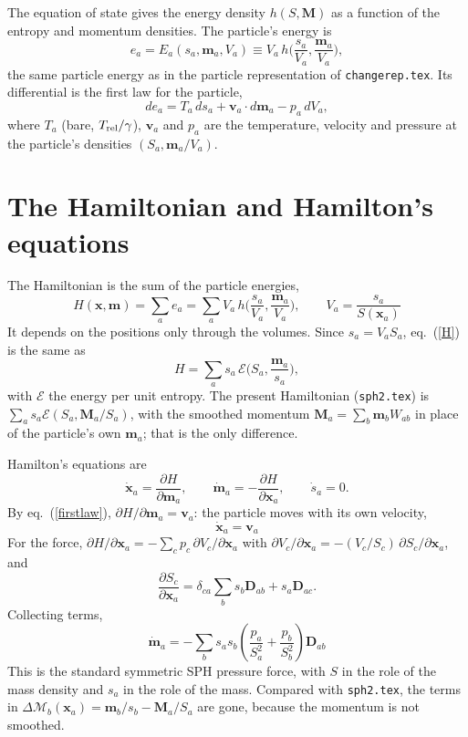 \documentclass[11pt,aps,preprint,nofootinbib,superscriptaddress,tightenlines]{revtex4-2}
\def\st{\begin{equation}}
\def\stp{\end{equation}}
\def\Eq#1{eq.~(\ref{#1})}
\begin{document}
The equation of state gives the energy density $h(S,\bm M)$ as a function of the
entropy and momentum densities.  The particle's energy is
\st
e_a=E_a(s_a,\bm m_a,V_a)\equiv V_a\,h\Big(\frac{s_a}{V_a},\frac{\bm m_a}{V_a}\Big),
\label{ea}
\stp
the same particle energy as in the particle representation of
\texttt{changerep.tex}.  Its differential is the first law for the particle,
\st
de_a=T_a\,ds_a+\bm v_a\cdot d\bm m_a-p_a\,dV_a ,
\label{firstlaw}
\stp
where $T_a$ (bare, $T_{\rm rel}/\gamma$), $\bm v_a$ and $p_a$ are the temperature,
velocity and pressure at the particle's densities $(S_a,\bm m_a/V_a)$.

\section{The Hamiltonian and Hamilton's equations}
\label{sec:ham}

The Hamiltonian is the sum of the particle energies,
\st
\boxed{\;H(\bm x,\bm m)=\sum_ae_a=\sum_aV_a\,h\Big(\frac{s_a}{V_a},\frac{\bm m_a}{V_a}\Big),
\qquad V_a=\frac{s_a}{S(\bm x_a)}\;}
\label{H}
\stp
It depends on the positions only through the volumes.  Since $s_a=V_aS_a$,
\Eq{H} is the same as
\st
H=\sum_as_a\,\mathcal E\Big(S_a,\frac{\bm m_a}{s_a}\Big),
\stp
with $\mathcal E$ the energy per unit entropy.  The present Hamiltonian
(\texttt{sph2.tex}) is $\sum_as_a\mathcal E(S_a,\bm M_a/S_a)$, with the smoothed
momentum $\bm M_a=\sum_b\bm m_bW_{ab}$ in place of the particle's own
$\bm m_a$; that is the only difference.

Hamilton's equations are
\st
\dot{\bm x}_a=\frac{\partial H}{\partial\bm m_a},\qquad
\dot{\bm m}_a=-\frac{\partial H}{\partial\bm x_a},\qquad \dot s_a=0 .
\stp
By \Eq{firstlaw}, $\partial H/\partial\bm m_a=\bm v_a$: the particle moves with
its own velocity,
\st
\boxed{\;\dot{\bm x}_a=\bm v_a\;}
\label{xdot}
\stp
For the force, $\partial H/\partial\bm x_a=-\sum_cp_c\,\partial V_c/\partial\bm x_a$ with
$\partial V_c/\partial\bm x_a=-(V_c/S_c)\,\partial S_c/\partial\bm x_a$, and
\st
\frac{\partial S_c}{\partial\bm x_a}=\delta_{ca}\sum_bs_b\bm D_{ab}+s_a\bm D_{ac}.
\stp
Collecting terms,
\st
\boxed{\;\dot{\bm m}_a=-\sum_bs_as_b\left(\frac{p_a}{S_a^2}+\frac{p_b}{S_b^2}\right)\bm D_{ab}\;}
\label{mdot}
\stp
This is the standard symmetric SPH pressure force, with $S$ in the role of the
mass density and $s_a$ in the role of the mass.  Compared with \texttt{sph2.tex},
the terms in $\Delta\mathcal M_b(\bm x_a)=\bm m_b/s_b-\bm M_a/S_a$ are gone,
because the momentum is not smoothed.
\end{document}
